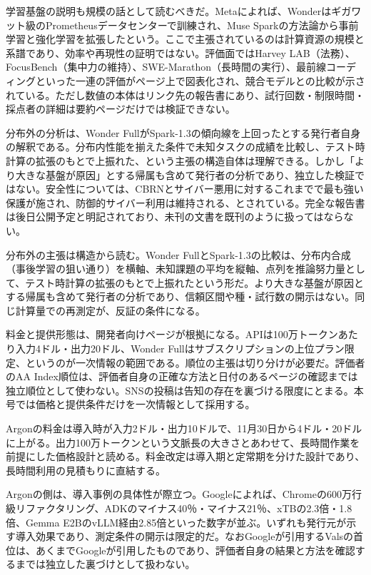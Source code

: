 \documentclass[lualatex,a4paper,10pt]{jlreq}
\begin{document}
学習基盤の説明も規模の話として読むべきだ。Metaによれば、Wonderはギガワット級のPrometheusデータセンターで訓練され、Muse Sparkの方法論から事前学習と強化学習を拡張したという。ここで主張されているのは計算資源の規模と系譜であり、効率や再現性の証明ではない。評価面ではHarvey LAB（法務）、FocusBench（集中力の維持）、SWE-Marathon（長時間の実行）、最前線コーディングといった一連の評価がページ上で図表化され、競合モデルとの比較が示されている。ただし数値の本体はリンク先の報告書にあり、試行回数・制限時間・採点者の詳細は要約ページだけでは検証できない。
\cite{B01,B62,B63,B02,B64,B03}


分布外の分析は、Wonder FullがSpark-1.3の傾向線を上回ったとする発行者自身の解釈である。分布内性能を揃えた条件で未知タスクの成績を比較し、テスト時計算の拡張のもとで上振れた、という主張の構造自体は理解できる。しかし「より大きな基盤が原因」とする帰属も含めて発行者の分析であり、独立した検証ではない。安全性については、CBRNとサイバー悪用に対するこれまでで最も強い保護が施され、防御的サイバー利用は維持される、とされている。完全な報告書は後日公開予定と明記されており、未刊の文書を既刊のように扱ってはならない。
\cite{B01,B62,B63,B02,B64,B03}


分布外の主張は構造から読む。Wonder FullとSpark-1.3の比較は、分布内合成（事後学習の狙い通り）を横軸、未知課題の平均を縦軸、点列を推論努力量として、テスト時計算の拡張のもとで上振れたという形だ。より大きな基盤が原因とする帰属も含めて発行者の分析であり、信頼区間や種・試行数の開示はない。同じ計算量での再測定が、反証の条件になる。
\cite{B01,B62,B63,B02,B64,B03}


料金と提供形態は、開発者向けページが根拠になる。APIは100万トークンあたり入力4ドル・出力20ドル、Wonder Fullはサブスクリプションの上位プラン限定、というのが一次情報の範囲である。順位の主張は切り分けが必要だ。評価者のAA Index順位は、評価者自身の正確な方法と日付のあるページの確認までは独立順位として使わない。SNSの投稿は告知の存在を裏づける限度にとまる。本号では価格と提供条件だけを一次情報として採用する。
\cite{B01,B62,B63,B02,B64,B03}


Argonの料金は導入時が入力2ドル・出力10ドルで、11月30日から4ドル・20ドルに上がる。出力100万トークンという文脈長の大きさとあわせて、長時間作業を前提にした価格設計と読める。料金改定は導入期と定常期を分けた設計であり、長時間利用の見積もりに直結する。
\cite{B05,B65,B08,B04,B07,B06}


Argonの側は、導入事例の具体性が際立つ。Googleによれば、Chromeの600万行級リファクタリング、ADKのマイナス40％・マイナス21％、xTBの2.3倍・1.8倍、Gemma E2BのvLLM経由2.85倍といった数字が並ぶ。いずれも発行元が示す導入効果であり、測定条件の開示は限定的だ。なおGoogleが引用するValsの首位は、あくまでGoogleが引用したものであり、評価者自身の結果と方法を確認するまでは独立した裏づけとして扱わない。
\cite{B05,B65,B08,B04,B07,B06}
\end{document}
